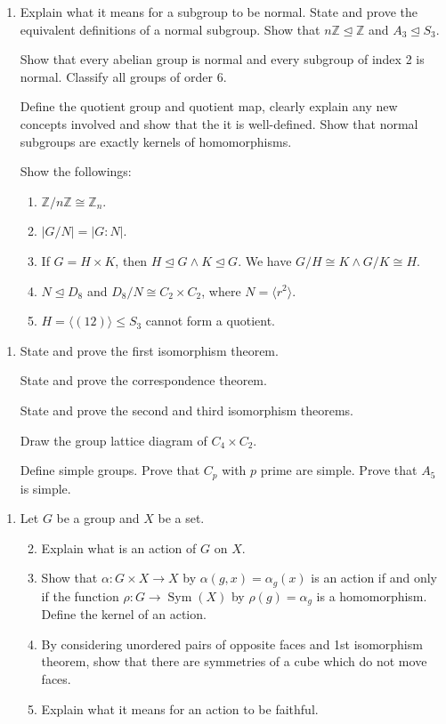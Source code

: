 \documentclass[11pt]{article}
\newlength{\qspace}
\newcounter{qnumber}
\newenvironment{question}%
 {\vspace{\qspace}
  \begin{enumerate}[\bfseries 1\quad][10]%
    \setcounter{enumi}{\value{qnumber}}%
    \item%
 }
{
  \end{enumerate}
  \filbreak
  \stepcounter{qnumber}
 }
\newenvironment{questionparts}[1][1]%
 {
  \begin{enumerate}[\bfseries (i)]%
    \setcounter{enumii}{#1}
    \addtocounter{enumii}{-1}
    \setlength{\parskip}{3pt}
 }
 {
  \end{enumerate}
 }
\DeclareMathOperator{\sym}{Sym}
\def\le{\leqslant}
\begin{document}
\begin{question}
  Explain what it means for a subgroup to be normal. State and prove the equivalent definitions of a normal subgroup. Show that $ n \mathbb{Z} \trianglelefteq \mathbb{Z} $ and $ A_3 \trianglelefteq S_3 $.

  Show that every abelian group is normal and every subgroup of index 2 is normal. Classify all groups of order 6.

  Define the quotient group and quotient map, clearly explain any new concepts involved and show that the it is well-defined. Show that normal subgroups are exactly kernels of homomorphisms.

  Show the followings:
  \begin{enumerate}
    \item $ \mathbb{Z}/n\mathbb{Z} \cong \mathbb{Z}_{n} $.
    \item $ |G/N|=|G:N| $.
    \item If $ G=H\times K $, then $ H \trianglelefteq G \land K\trianglelefteq G $. We have $ G/H \cong K \land G/K \cong H $.
    \item $ N \trianglelefteq D_8 $ and $ D_8/N\cong C_2 \times C_2 $, where $ N=\langle r^2 \rangle  $. 
    \item $ H=\langle (12) \rangle \le S_3 $ cannot form a quotient.
  \end{enumerate}
\end{question}

\begin{question}
  State and prove the first isomorphism theorem.

  State and prove the correspondence theorem.

  State and prove the second and third isomorphism theorems.

  Draw the group lattice diagram of $ C_4 \times C_2 $.

  Define simple groups. Prove that $ C_p $ with $p$ prime are simple. Prove that $A_5$ is simple.
\end{question}

\begin{question}
  Let $ G $ be a group and $X$ be a set.
  \begin{questionparts}
    \item Explain what is an action of $G$ on $X$.
    \item Show that $ \alpha:G \times X \to X $ by $ \alpha(g,x)=\alpha_g(x) $ is an action if and only if the function $ \rho:G \to \sym(X) $ by $ \rho(g)=\alpha_g $ is a homomorphism. Define the kernel of an action.
    \item By considering unordered pairs of opposite faces and 1st isomorphism theorem, show that there are symmetries of a cube which do not move faces.
    \item Explain what it means for an action to be faithful.
  \end{questionparts}
\end{question}
\end{document}

